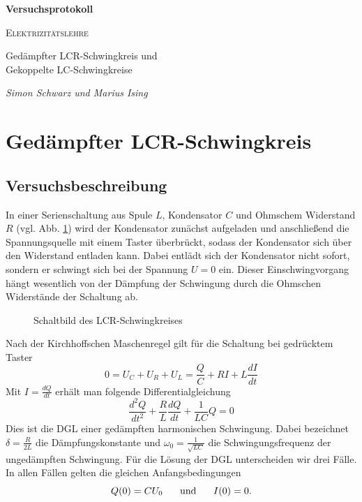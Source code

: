 \documentclass[a4paper, 12pt]{scrartcl}
\begin{document}
\begin{titlepage}
	\centering
	{\Huge\bfseries Versuchsprotokoll\par}
	\vspace{2cm}
	{\scshape\LARGE Elektrizitätslehre \par}
	\vspace{1cm}
	{\Large Gedämpfter LCR-Schwingkreis und \\ Gekoppelte LC-Schwingkreise\par}
	\vfill
	{\large\itshape Simon Schwarz und Marius Ising\par}

	\vfill
\end{titlepage}

\tableofcontents
\newpage


\section{Gedämpfter LCR-Schwingkreis}


\subsection{Versuchsbeschreibung}

In einer Serienschaltung aus Spule $L$, Kondensator $C$ und Ohmschem Widerstand $R$ (vgl. Abb. \ref{abb:schaltLCR}) wird der Kondensator zunächst aufgeladen und anschließend die Spannungsquelle mit einem Taster überbrückt, sodass der Kondensator sich über den Widerstand entladen kann. Dabei entlädt sich der Kondensator nicht sofort, sondern er schwingt sich bei der Spannung $U=0$ ein. Dieser Einschwingvorgang hängt wesentlich von der Dämpfung der Schwingung durch die Ohmschen Widerstände der Schaltung ab.

\begin{figure}[H]
\centering
{}
\caption{Schaltbild des LCR-Schwingkreises}
\label{abb:schaltLCR}
\end{figure}

Nach der Kirchhoffschen Maschenregel gilt für die Schaltung bei gedrücktem Taster
$$0 = U_C + U_R + U_L = \frac QC + RI + L \frac{dI}{dt}$$
Mit $I = \frac{dQ}{dt}$ erhält man folgende Differentialgleichung
$$\frac{d^2Q}{dt^2} + \frac{R}{L} \frac{dQ}{dt} + \frac{1}{LC}Q = 0$$
Dies ist die DGL einer gedämpften harmonischen Schwingung. Dabei bezeichnet $\delta = \frac{R}{2L}$ die Dämpfungskonstante und $\omega_0 = \frac{1}{\sqrt{LC}}$ die Schwingungsfrequenz der ungedämpften Schwingung. 
Für die Lösung der DGL unterscheiden wir drei Fälle. In allen Fällen gelten die gleichen Anfangsbedingungen
$$Q(0) = CU_0 \hspace{0.5cm} \text{ und } \hspace{0.5cm} I(0) = 0.$$
\end{document}
